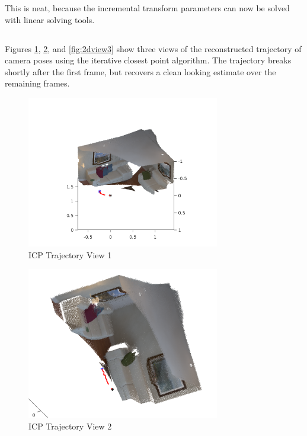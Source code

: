 \documentclass[12pt]{article}
\begin{document}
This is neat, because the incremental transform parameters can now be solved with linear solving tools.

\subsection{}
Figures \ref{fig:2dview1}, \ref{fig:2dview2}, and \ref{fig:2dview3} show three views of the reconstructed trajectory of camera poses using the iterative closest point algorithm. The trajectory breaks shortly after the first frame, but recovers a clean looking estimate over the remaining frames.


\begin{figure}[H]
\centering
\includegraphics[page=1,width=0.75\textwidth]{2d_view1}
\caption{ ICP Trajectory View 1 } 
\label{fig:2dview1}
\end{figure}   

\begin{figure}[H]
\centering
\includegraphics[page=1,width=0.75\textwidth]{2d_view2}
\caption{ ICP Trajectory View 2 } 
\label{fig:2dview2}
\end{figure}   
\end{document}
